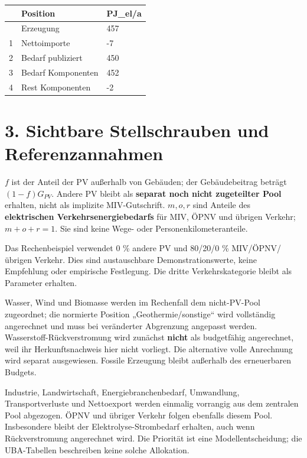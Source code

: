 \documentclass[
  ngerman,
  a4paper,
  DIV=11]{scrreprt}
\newcounter{none} %
\begin{document}
{\def\LTcaptype{none} %
\begin{longtable}[]{@{}lll@{}}
\toprule\noalign{}
& Position & PJ\_el/a \\
\midrule\noalign{}
\endhead
\bottomrule\noalign{}
\endlastfoot
0 & Erzeugung & 457 \\
1 & Nettoimporte & -7 \\
2 & Bedarf publiziert & 450 \\
3 & Bedarf Komponenten & 452 \\
4 & Rest Komponenten & -2 \\
\end{longtable}
}

\section{3. Sichtbare Stellschrauben und
Referenzannahmen}\label{sichtbare-stellschrauben-und-referenzannahmen}

\(f\) ist der Anteil der PV außerhalb von Gebäuden; der Gebäudebeitrag
beträgt \((1-f)G_{PV}\). Andere PV bleibt als \textbf{separat noch nicht
zugeteilter Pool} erhalten, nicht als implizite MIV-Gutschrift.
\(m,o,r\) sind Anteile des \textbf{elektrischen Verkehrsenergiebedarfs}
für MIV, ÖPNV und übrigen Verkehr; \(m+o+r=1\). Sie sind keine Wege-
oder Personenkilometeranteile.

Das Rechenbeispiel verwendet 0 \% andere PV und 80/20/0 \%
MIV/ÖPNV/übrigen Verkehr. Dies sind austauschbare Demonstrationswerte,
keine Empfehlung oder empirische Festlegung. Die dritte
Verkehrskategorie bleibt als Parameter erhalten.

Wasser, Wind und Biomasse werden im Rechenfall dem nicht-PV-Pool
zugeordnet; die normierte Position „Geothermie/sonstige`` wird
vollständig angerechnet und muss bei veränderter Abgrenzung angepasst
werden. Wasserstoff-Rückverstromung wird zunächst \textbf{nicht} als
budgetfähig angerechnet, weil ihr Herkunftsnachweis hier nicht vorliegt.
Die alternative volle Anrechnung wird separat ausgewiesen. Fossile
Erzeugung bleibt außerhalb des erneuerbaren Budgets.

Industrie, Landwirtschaft, Energiebranchenbedarf, Umwandlung,
Transportverluste und Nettoexport werden einmalig vorrangig aus dem
zentralen Pool abgezogen. ÖPNV und übriger Verkehr folgen ebenfalls
diesem Pool. Insbesondere bleibt der Elektrolyse-Strombedarf erhalten,
auch wenn Rückverstromung angerechnet wird. Die Priorität ist eine
Modellentscheidung; die UBA-Tabellen beschreiben keine solche
Allokation.
\end{document}
